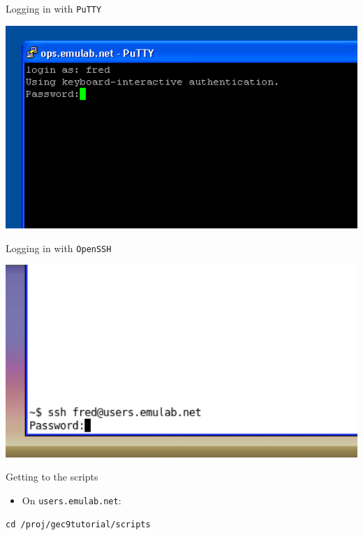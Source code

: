 \documentclass[landscape]{slides}
\newcommand{\heading}[1]{{\fontseries{b}\selectfont\begin{center}{\LARGE\color{red} #1}\end{center}}}
\newcommand{\code}[1]{\begin{center}{\tt #1}\end{center}}
\begin{document}
\begin{slide}
\heading{Logging in with {\tt PuTTY}}
\begin{center}
\includegraphics[width=17cm]{putty-2}
\end{center}
\end{slide}

\begin{slide}
\heading{Logging in with {\tt OpenSSH}}
\begin{center}
\includegraphics[width=17cm]{openssh}
\end{center}
\end{slide}

\begin{slide}
\heading{Getting to the scripts}
\begin{itemize}
\item On {\tt users.emulab.net}:
\end{itemize}
\begin{Large}\code{cd /proj/gec9tutorial/scripts}\end{Large}
\end{slide}
\end{document}
